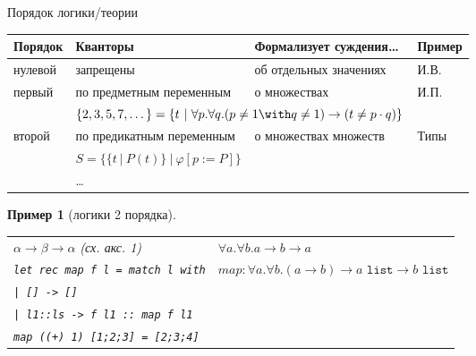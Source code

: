 \documentclass[aspectratio=169]{beamer}
\newtheorem{exm}{Пример}[section]
\begin{document}
\begin{frame}{Порядок логики/теории}
\begin{tabular}{llll}
Порядок & Кванторы & Формализует суждения\dots & Пример\\\hline
нулевой & запрещены & об отдельных значениях & И.В.\\
первый & по предметным переменным & о множествах & И.П.\\
    &   \multicolumn{2}{l}{\color{olive}$\{2,3,5,7,\dots\} = \{ t\ |\ \forall p.\forall q.(p \ne 1 \with q \ne 1) \rightarrow (t \ne p\cdot q)\}$}\\
второй & по предикатным переменным & о множествах множеств & Типы\\
    &   \multicolumn{2}{l}{\color{olive}$S = \{ \{t\ |\ P(t)\}\ |\ \varphi[p := P] \}$}\\
 & \dots 
\end{tabular}
\pause\vspace{0.3cm}

\begin{exm}[логики 2 порядка]\upshape
\begin{tabular}{ll}
$\alpha\rightarrow\beta\rightarrow\alpha$ (сх. акс. 1) & $\forall a.\forall b.a \rightarrow b \rightarrow a$ \vspace{0.1cm}\\
\texttt{let rec map f l = match l with} & $map: \forall a.\forall b.(a \rightarrow b) \rightarrow a\texttt{ list} \rightarrow b\texttt{ list}$ \\
\texttt{| [] -> []} \\
\texttt{| l1::ls -> f l1 :: map f l1}\vspace{0.1cm}\\
\texttt{map ((+) 1) [1;2;3] = [2;3;4]}
\end{tabular}
\end{exm}

\end{frame}
\end{document}
